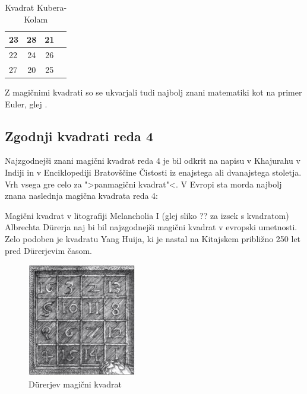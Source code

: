 \documentclass[a4paper,12pt]{article}
\begin{document}

  
  \begin{table}[hpt]
   \centering
   \normalsize
   \caption{Kvadrat Kubera-Kolam}
   \label{table:kubera}

   \begin{tabular}{|l|c|c|c|}
      \hline
    23 & 28 & 21 \\\hline
    22 & 24 & 26 \\\hline
    27 & 20 & 25 \\\hline
   \end{tabular}
  \end{table}

Z magičnimi kvadrati so se ukvarjali tudi najbolj znani matematiki kot na
primer Euler, glej \cite{euler}. %


\subsection{Zgodnji kvadrati reda 4}

Najzgodnejši znani magični kvadrat reda 4 je bil odkrit na napisu
v Khajurahu v Indiji in v Enciklopediji Bratovščine Čistosti iz enajstega
ali dvanajstega stoletja. Vrh vsega gre celo za ">panmagični kvadrat"<.
V Evropi sta morda najbolj znana naslednja magična kvadrata reda 4:

Magični kvadrat v litografiji Melancholia I (glej sliko ??
za izsek s kvadratom) Albrechta Dürerja naj bi bil najzgodnejši magični kvadrat
v evropski umetnosti. Zelo podoben je kvadratu Yang Huija, ki je nastal na Kitajskem
približno 250 let pred Dürerjevim časom. %

\begin{figure}[!ht]
   \centering
\includegraphics[scale=1.5]{durer.png}
\caption{Dürerjev magični kvadrat}
\label{fig:durer}
\end{figure}
\end{document}
